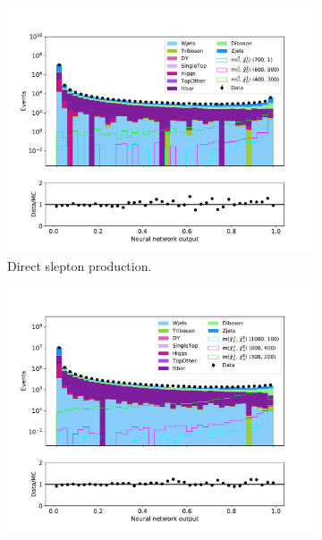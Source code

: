 \begin{figure}[H]
    \centering
    \begin{subfigure}[t!]{0.49\textwidth}
        \includegraphics[width = \textwidth]{Figures/Stacked/stackedplot_NN_All_level_slepslep.pdf}
        \caption{Direct slepton production.}
        \label{fig:NNdataAllSlepSlep}
    \end{subfigure}
    \begin{subfigure}[t!]{0.49\textwidth}
        \includegraphics[width = \textwidth]{Figures/Stacked/stackedplot_NN_All_level_slepsnu.pdf}

\end{subfigure}
\end{figure}
